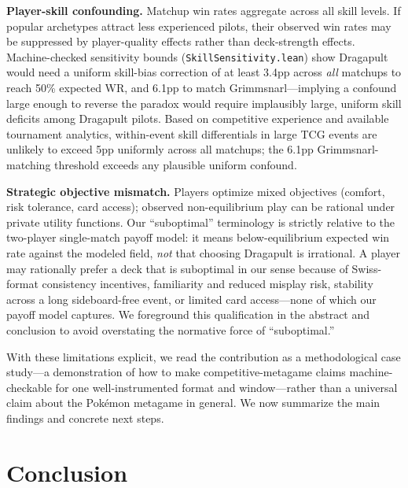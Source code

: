\documentclass[journal]{IEEEtran}
\newif\ifhighlightchanges
\newcommand{\revised}[1]{\ifhighlightchanges\textcolor{blue!70!black}{#1}\else#1\fi}
\let\origsection\section
\renewcommand{\section}{\needspace{4\baselineskip}\origsection}
\begin{document}
\textbf{Player-skill confounding.}
Matchup win rates aggregate across all skill levels.
If popular archetypes attract less experienced pilots, their observed win rates may be suppressed by player-quality effects rather than deck-strength effects.
Machine-checked sensitivity bounds (\texttt{SkillSensitivity.lean}) show Dragapult would need a uniform skill-bias correction of at least 3.4pp across \emph{all} matchups to reach 50\% expected WR, and 6.1pp to match Grimmsnarl---implying a confound large enough to reverse the paradox would require implausibly large, uniform skill deficits among Dragapult pilots.
Based on competitive experience and available tournament analytics, within-event skill differentials in large TCG events are unlikely to exceed 5pp uniformly across all matchups; the 6.1pp Grimmsnarl-matching threshold exceeds any plausible uniform confound.

\textbf{Strategic objective mismatch.}
Players optimize mixed objectives (comfort, risk tolerance, card access); observed non-equilibrium play can be rational under private utility functions.
\revised{Our ``suboptimal'' terminology is strictly relative to the two-player single-match payoff model: it means below-equilibrium expected win rate against the modeled field, \emph{not} that choosing Dragapult is irrational.
A player may rationally prefer a deck that is suboptimal in our sense because of Swiss-format consistency incentives, familiarity and reduced misplay risk, stability across a long sideboard-free event, or limited card access---none of which our payoff model captures.
We foreground this qualification in the abstract and conclusion to avoid overstating the normative force of ``suboptimal.''}

\revised{With these limitations explicit, we read the contribution as a methodological case study---a demonstration of how to make competitive-metagame claims machine-checkable for one well-instrumented format and window---rather than a universal claim about the Pok\'emon metagame in general.
We now summarize the main findings and concrete next steps.}

\section{Conclusion}\label{sec:conclusion}
\end{document}
